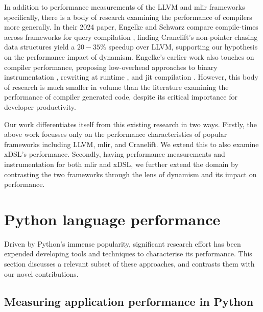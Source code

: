 In addition to performance measurements of the LLVM and \ac{mlir} frameworks specifically, there is a body of research examining the performance of compilers more generally.
In their 2024 paper, Engelke and Schwarz compare compile-times across frameworks for query compilation \cite{engelkeCompileTimeAnalysisCompiler2024}, finding Cranelift's \cite{bytecodeallianceCranelift} non-pointer chasing data structures yield a $20-35\%$ speedup over LLVM, supporting our hypothesis on the performance impact of dynamism. Engelke's earlier work also touches on compiler performance, proposing low-overhead approaches to binary instrumentation \cite{engelkeInstrewLeveragingLLVM2020}, rewriting at runtime \cite{engelkeUsingLLVMOptimized2017}, and \ac{jit} compilation \cite{schwarzTPDEFastAdaptable2025} \cite{drescherFastTemplateBasedCode2024}.
However, this body of research is much smaller in volume than the literature examining the performance of compiler generated code, despite its critical importance for developer productivity.


Our work differentiates itself from this existing research in two ways.
Firstly, the above work focusses only on the performance characteristics of popular frameworks including LLVM, \ac{mlir}, and Cranelift. We extend this to also examine xDSL's performance.
Secondly, having performance measurements and instrumentation for both \ac{mlir} and xDSL, we further extend the domain by contrasting the two frameworks through the lens of dynamism and its impact on performance.




\section{Python language performance}
\label{sec:python-performance}

Driven by Python's immense popularity, significant research effort has been expended developing tools and techniques to characterise its performance.
This section discusses a relevant subset of these approaches, and contrasts them with our novel contributions.


\subsection{Measuring application performance in Python}
\label{sec:python-performance-application}


